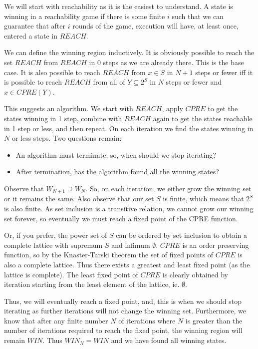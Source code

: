 \documentclass[a4paper,twoside,openright,11pt]{book}
\theoremstyle{definition}
\begin{document}
We will start with reachability as it is the easiest to understand. A state is winning in a reachability game if there is some finite $i$ such that we can guarantee that after $i$ rounds of the game, execution will have, at least once, entered a state in $REACH$.

We can define the winning region inductively. It is obviously possible to reach the set $REACH$ from $REACH$ in 0 steps as we are already there. This is the base case. It is also possible to reach $REACH$ from $x \in S$ in $N + 1$ steps or fewer iff it is possible to reach $REACH$ from all of $Y \subseteq 2^S$ in $N$ steps or fewer and $x \in CPRE(Y)$.

This suggests an algorithm. We start with $REACH$, apply $CPRE$ to get the states winning in 1 step, combine with $REACH$ again to get the states reachable in 1 step or less, and then repeat. On each iteration we find the states winning in $N$ or less steps. Two questions remain: 

\begin{itemize}
    \item An algorithm must terminate, so, when should we stop iterating?
    \item After termination, has the algorithm found all the winning states?
\end{itemize}

Observe that $W_{N+1} \supseteq W_N$. So, on each iteration, we either grow the winning set or it remains the same. Also observe that our set $S$ is finite, which means that $2^S$ is also finite. As set inclusion is a transitive relation, we cannot grow our winning set forever, so eventually we must reach a fixed point of the CPRE function. 

Or, if you prefer, the power set of $S$ can be ordered by set inclusion to obtain a complete lattice with supremum $S$ and infimum $\emptyset$. $CPRE$ is an order preserving function, so by the Knaster-Tarski theorem the set of fixed points of $CPRE$ is also a complete lattice. Thus there exists a greatest and least fixed point (as the lattice is complete). The least fixed point of $CPRE$ is clearly obtained by iteration starting from the least element of the lattice, ie. $\emptyset$.

Thus, we will eventually reach a fixed point, and, this is when we should stop iterating as further iterations will not change the winning set. Furthermore, we know that after any finite number $N$ of iterations where $N$ is greater than the number of iterations required to reach the fixed point, the winning region will remain $WIN$. Thus $WIN_N = WIN$ and we have found all winning states.
\end{document}
